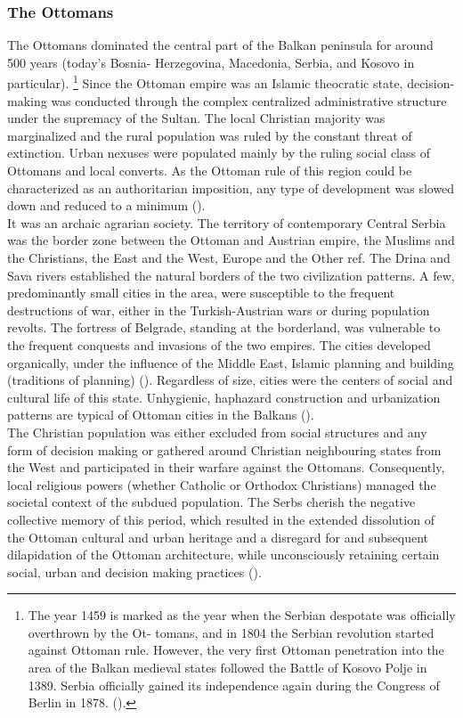 \documentclass[11pt]{report}
\begin{document}
\subsubsection{The Ottomans}

The Ottomans  dominated  the  central  part  of  the  Balkan  peninsula for around 500 years  (today’s  Bosnia- Herzegovina, Macedonia, Serbia, and Kosovo in particular).
\footnote{The year 1459 is marked as the year when the  Serbian despotate was officially overthrown by the Ot-
tomans, and in 1804 the Serbian revolution started against Ottoman rule. However, the very first Ottoman penetration into the area of the Balkan medieval states followed the Battle of Kosovo Polje in 1389. Serbia officially gained its independence again during the Congress of Berlin in 1878. (\href{Corovic}{\citealt{corovic_istorija_1997}}).}
Since the Ottoman empire was an Islamic theocratic state, decision-making was conducted through the complex centralized administrative structure under the supremacy of the Sultan. The local Christian majority was marginalized and the rural population was ruled by the constant threat of extinction. Urban nexuses were populated mainly by the ruling social class of Ottomans and local converts. As the Ottoman rule of this region could be characterized as an authoritarian imposition, any type of development was slowed down and reduced to a minimum (\href{Nedovic}{\citealt{nedovicbudic_waves_2006}}).
\\

It was an archaic agrarian society. The territory of contemporary Central Serbia was the border zone between the Ottoman and Austrian empire, the Muslims and the Christians, the East and the West, Europe and the Other ref. The Drina and Sava rivers established the natural borders of the two civilization patterns. A few, predominantly small cities in the area, were susceptible to the frequent destructions of war, either in the Turkish-Austrian wars or during population revolts. The fortress of Belgrade, standing at the borderland, was vulnerable to the frequent conquests and invasions of the two empires. The cities developed organically, under the influence of the Middle East, Islamic planning and building (traditions
of planning) (\href{Nedovic}{\citealt{nedovicbudic_waves_2006}}). Regardless of size, cities were the centers of social and cultural life of this state. Unhygienic, haphazard construction and urbanization patterns are typical of Ottoman cities in the Balkans (\href{Kadijevic}{\citealt{kadijevic_jedan_2007}}). 
\\ 
The Christian population was either excluded from social structures and any form of decision making or gathered around Christian neighbouring states from the West and participated in their warfare against the Ottomans. Consequently, local religious powers (whether Catholic or Orthodox Christians) managed the societal context of the subdued population.
The Serbs cherish the negative collective memory of this period, which resulted in the extended dissolution of the Ottoman cultural and urban heritage and a disregard for and subsequent dilapidation of the Ottoman architecture, while unconsciously retaining certain social, urban and decision making practices (\href{Blagojevic}{\citealt{blagojevic_urban_2009}}).
\end{document}
